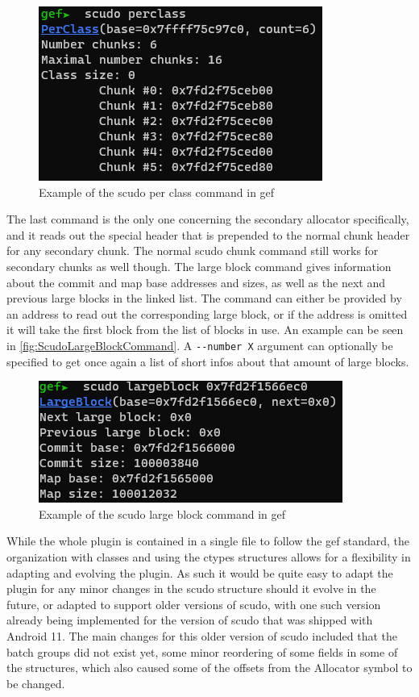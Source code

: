 \documentclass[a4paper,11pt,oneside]{report}
\begin{document}
\begin{figure}[h!]
  \centering
  \includegraphics{figures/ScudoPerClassCommand.png}
  \caption{Example of the scudo per class command in gef}
  \label{fig:ScudoPerClassCommand}
\end{figure}

The last command is the only one concerning the secondary allocator specifically,
and it reads out the special header that is prepended to the normal chunk header
for any secondary chunk. The normal scudo chunk command still works for secondary
chunks as well though. The large block command gives information about the
commit and map base addresses and sizes, as well as the next and previous large
blocks in the linked list. The command can either be provided by an address
to read out the corresponding large block, or if the address is omitted it will
take the first block from the list of blocks in use. An example can be seen in
\autoref{fig:ScudoLargeBlockCommand}. A \verb|--number X| argument can optionally be
specified to get once again a list of short infos about that amount of large
blocks.

\begin{figure}[h!]
  \centering
  \includegraphics{figures/ScudoLargeBlockCommand.png}
  \caption{Example of the scudo large block command in gef}
  \label{fig:ScudoLargeBlockCommand}
\end{figure}

While the whole plugin is contained in a single file to follow the gef standard,
the organization with classes and using the ctypes structures allows for a
flexibility in adapting and evolving the plugin. As such it would be quite
easy to adapt the plugin for any minor changes in the scudo structure should
it evolve in the future, or adapted to support older versions of scudo, with
one such version already being implemented for the version of scudo that was
shipped with Android 11. The main changes for this older version of scudo
included that the batch groups did not exist yet, some minor reordering of
some fields in some of the structures, which also caused some of the offsets
from the Allocator symbol to be changed.
\end{document}
